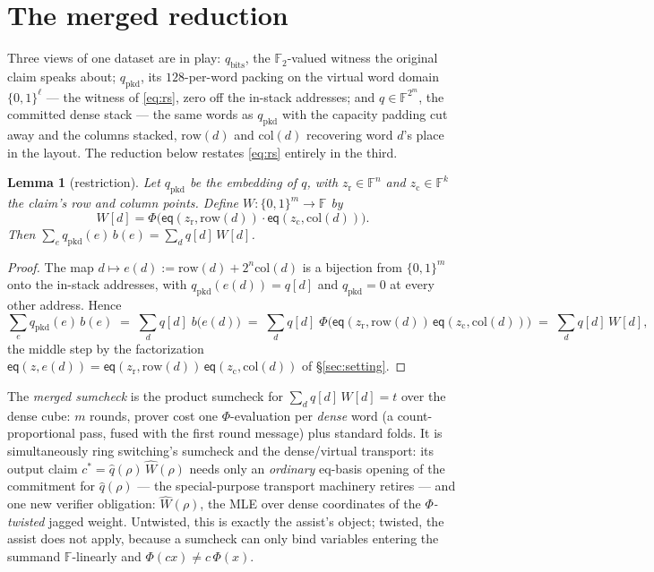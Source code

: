 \documentclass[11pt]{article}
\newcommand{\F}{\mathbb{F}}
\newcommand{\Ftwo}{\F_2}
\newcommand{\eq}{\mathsf{eq}}
\newcommand{\rowof}{\mathrm{row}}
\newcommand{\colof}{\mathrm{col}}
\newcommand{\qpkd}{q_{\mathrm{pkd}}}
\newcommand{\qbits}{q_{\mathrm{bits}}}
\newtheorem{lemma}[theorem]{Lemma}
\begin{document}
\section{The merged reduction}\label{sec:merged}

Three views of one dataset are in play: $\qbits$, the $\Ftwo$-valued
witness the original claim speaks about; $\qpkd$, its $128$-per-word
packing on the virtual word domain $\{0,1\}^{\ell}$ --- the witness of
\eqref{eq:rs}, zero off the in-stack addresses; and $q \in \F^{2^m}$,
the committed dense stack --- the same words as $\qpkd$ with the
capacity padding cut away and the columns stacked, $\rowof(d)$ and
$\colof(d)$ recovering word $d$'s place in the layout. The reduction
below restates \eqref{eq:rs} entirely in the third.

\begin{lemma}[restriction]\label{lem:restriction}
Let $\qpkd$ be the embedding of $q$, with $z_{\mathrm r} \in \F^{n}$ and
$z_{\mathrm c} \in \F^{k}$ the claim's row and column points. Define
$W : \{0,1\}^m \to \F$ by
\[
  W[d] = \Phi\bigl(\eq(z_{\mathrm r}, \rowof(d))\cdot
                   \eq(z_{\mathrm c}, \colof(d))\bigr).
\]
Then $\sum_{e} \qpkd(e)\, b(e) = \sum_{d} q[d]\, W[d]$.
\end{lemma}

\begin{proof}
The map $d \mapsto e(d) := \rowof(d) + 2^n \colof(d)$ is a bijection
from $\{0,1\}^m$ onto the in-stack addresses, with $\qpkd(e(d)) = q[d]$
and $\qpkd = 0$ at every other address. Hence
\[
  \sum_{e} \qpkd(e)\, b(e)
  \;=\; \sum_{d} q[d]\; b\bigl(e(d)\bigr)
  \;=\; \sum_{d} q[d]\;
        \Phi\bigl(\eq(z_{\mathrm r}, \rowof(d))\,
                  \eq(z_{\mathrm c}, \colof(d))\bigr)
  \;=\; \sum_{d} q[d]\, W[d],
\]
the middle step by the factorization
$\eq(z, e(d)) = \eq(z_{\mathrm r}, \rowof(d))\,
\eq(z_{\mathrm c}, \colof(d))$ of \S\ref{sec:setting}.
\end{proof}

The \emph{merged sumcheck} is the product sumcheck for
$\sum_d q[d]\,W[d] = t$ over the dense cube: $m$ rounds, prover cost
one $\Phi$-evaluation per \emph{dense} word (a count-proportional
pass, fused with the first round message) plus standard folds. It is simultaneously ring switching's sumcheck and the
dense/virtual transport: its output claim
$c^* = \hat q(\rho)\,\widehat W(\rho)$ needs only an \emph{ordinary}
eq-basis opening of the commitment for $\hat q(\rho)$ --- the
special-purpose transport machinery retires --- and one new verifier
obligation: $\widehat W(\rho)$, the MLE over dense coordinates of the
\emph{$\Phi$-twisted} jagged weight. Untwisted, this is exactly the
assist's object; twisted, the assist does not apply, because a sumcheck
can only bind variables entering the summand $\F$-linearly and
$\Phi(cx) \ne c\,\Phi(x)$.
\end{document}
